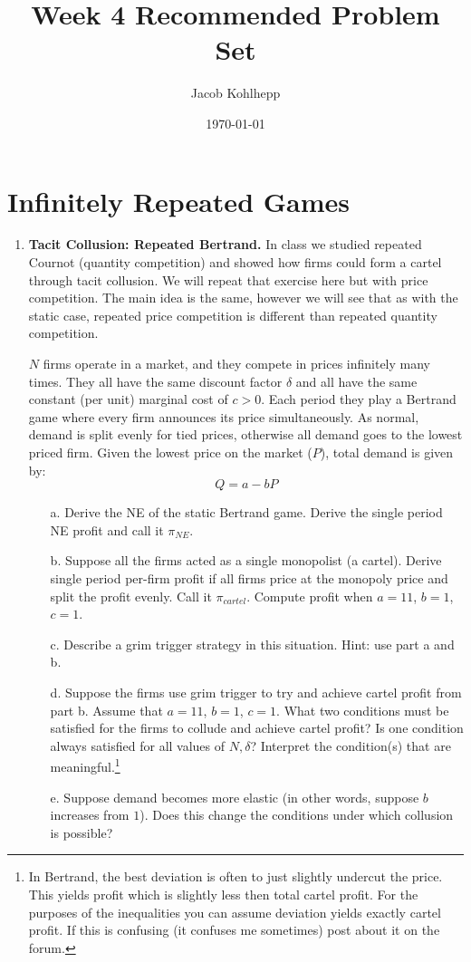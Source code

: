 \documentclass{article}
\begin{document}
\title{Week 4 Recommended Problem Set}
\author{Jacob Kohlhepp}
\date{\today}

\maketitle

\section{Infinitely Repeated Games}

\begin{enumerate}
    \item \textbf{Tacit Collusion: Repeated Bertrand.} In class we studied repeated Cournot (quantity competition) and showed how firms could form a cartel through tacit collusion. We will repeat that exercise here but with price competition. The main idea is the same, however we will see that as with the static case, repeated price competition is different than repeated quantity competition.
    
    $N$ firms operate in a market, and they compete in prices infinitely many times. They all have the same discount factor $\delta$ and all have the same constant (per unit) marginal cost of $c>0$. Each period they play a Bertrand game where every firm announces its price simultaneously. As normal, demand is split evenly for tied prices, otherwise all demand goes to the lowest priced firm. Given the lowest price on the market ($P$), total demand is given by:
    \[Q= a - b P \]
    \begin{enumerate}
        \item[a.] Derive the NE of the static Bertrand game. Derive the single period NE profit and call it $\pi_{NE}$.
        \item[b.] Suppose all the firms acted as a single monopolist (a cartel). Derive single period per-firm profit if all firms price at the monopoly price and split the profit evenly. Call it $\pi_{cartel}$. Compute profit when $a=11$, $b=1$, $c=1$.
        \item[c.] Describe a grim trigger strategy in this situation. Hint: use part a and b.
        \item[d.] Suppose the firms use grim trigger to try and achieve cartel profit from part b. Assume that $a=11$, $b=1$, $c=1$. What two conditions must be satisfied for the firms to collude and achieve cartel profit? Is one condition always satisfied for all values of $N, \delta$? Interpret the condition(s) that are meaningful.\footnote{In Bertrand, the best deviation is often to just slightly undercut the price. This yields profit which is slightly less then total cartel profit. For the purposes of the inequalities you can assume deviation yields exactly cartel profit. If this is confusing (it confuses me sometimes) post about it on the forum.}
        \item[e.] Suppose demand becomes more elastic (in other words, suppose $b$ increases from $1$). Does this change the conditions under which collusion is possible?
        \end{enumerate}
\end{enumerate}
\end{document}
